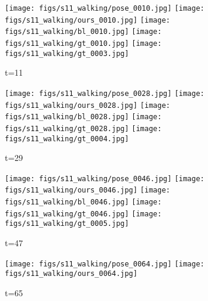 \documentclass{article}
\begin{document}
\begin{figure*}[thbp]
	\begin{subfigure}{0.04\linewidth}
        \raggedleft
    \end{subfigure}
    \begin{subfigure}{0.12\linewidth}
        \caption*{t=11}
        \vspace{-7pt}
	    \texttt{[image: figs/s11\_walking/pose\_0010.jpg]} 
  		\texttt{[image: figs/s11\_walking/ours\_0010.jpg]}
  		\texttt{[image: figs/s11\_walking/bl\_0010.jpg]}
  		\texttt{[image: figs/s11\_walking/gt\_0010.jpg]}
  		\texttt{[image: figs/s11\_walking/gt\_0003.jpg]}
	\end{subfigure} 
    \begin{subfigure}{0.12\linewidth}
        \caption*{t=29}
        \vspace{-7pt}
	    \texttt{[image: figs/s11\_walking/pose\_0028.jpg]} 
  		\texttt{[image: figs/s11\_walking/ours\_0028.jpg]}
  		\texttt{[image: figs/s11\_walking/bl\_0028.jpg]}
  		\texttt{[image: figs/s11\_walking/gt\_0028.jpg]}
  		\texttt{[image: figs/s11\_walking/gt\_0004.jpg]}
	\end{subfigure} 
    \begin{subfigure}{0.12\linewidth}
        \caption*{t=47}
        \vspace{-7pt}
	    \texttt{[image: figs/s11\_walking/pose\_0046.jpg]} 
  		\texttt{[image: figs/s11\_walking/ours\_0046.jpg]}
  		\texttt{[image: figs/s11\_walking/bl\_0046.jpg]}
  		\texttt{[image: figs/s11\_walking/gt\_0046.jpg]}
  		\texttt{[image: figs/s11\_walking/gt\_0005.jpg]}
	\end{subfigure} 
    \begin{subfigure}{0.12\linewidth}
        \caption*{t=65}
        \vspace{-7pt}
	    \texttt{[image: figs/s11\_walking/pose\_0064.jpg]} 
  		\texttt{[image: figs/s11\_walking/ours\_0064.jpg]}

\end{subfigure}
\end{figure*}
\end{document}

